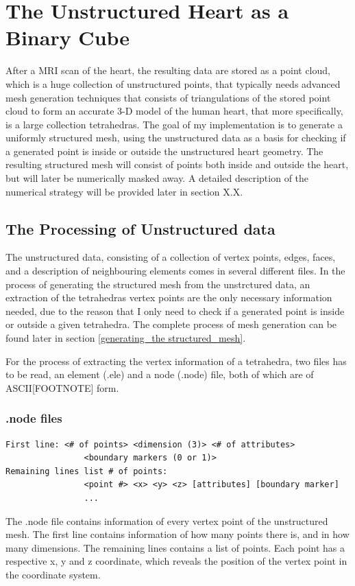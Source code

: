 \chapter{The Unstructured Heart as a Binary Cube} 
After a MRI scan of the heart, the resulting data are stored as a point cloud, which is a huge collection of unstructured points, that typically needs advanced mesh generation techniques that consists of triangulations of the stored point cloud to form an accurate 3-D model of the human heart, that more specifically, is a large collection tetrahedras. The goal of my implementation is to generate a uniformly structured mesh, using the unstructured data as a basis for checking if a generated point is inside or outside the unstructured heart geometry. The resulting structured mesh will consist of points both inside and outside the heart, but will later be numerically masked away. A detailed description of the numerical strategy will be provided later in section X.X.

\section{The Processing of Unstructured data}
The unstructured data, consisting of a collection of vertex points, edges, faces, and a description of neighbouring elements comes in several different files. In the process of generating the structured mesh from the unstrctured data, an extraction of the tetrahedras vertex points are the only necessary information needed, due to the reason that I only need to check if a generated point is inside or outside a given tetrahedra. The complete process of mesh generation can be found later in section \ref{generating_the structured_mesh}.

For the process of extracting the vertex information of a tetrahedra, two files has to be read, an element (.ele) and a node (.node) file, both of which are of ASCII[FOOTNOTE] form.

\subsection{.node files}
\begin{lstlisting}[caption=.node file]
First line:	<# of points> <dimension (3)> <# of attributes>
			 	<boundary markers (0 or 1)>
Remaining lines list # of points:
				<point #> <x> <y> <z> [attributes] [boundary marker]
				...
\end{lstlisting}
The .node file contains information of every vertex point of the unstructured mesh. The first line contains information of how many points there is, and in how many dimensions. The remaining lines contains a list of points. Each point has a respective x, y and z coordinate, which reveals the position of the vertex point in the coordinate system.

